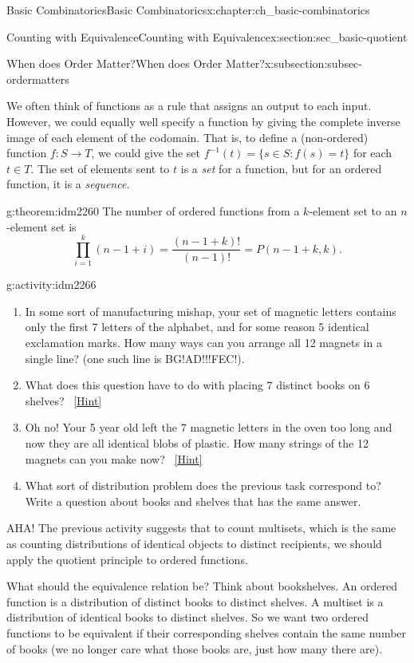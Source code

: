 \documentclass[oneside,10pt,]{book}
\numberwithin{equation}{chapter}
\def\inv{^{-1}}
\def\st{:}
\begin{document}
\begin{chapterptx}{Basic Combinatorics}{}{Basic Combinatorics}{}{}{x:chapter:ch_basic-combinatorics}
\begin{sectionptx}{Counting with Equivalence}{}{Counting with Equivalence}{}{}{x:section:sec_basic-quotient}
\begin{subsectionptx}{When does Order Matter?}{}{When does Order Matter?}{}{}{x:subsection:subsec-ordermatters}
\par
We often think of functions as a rule that assigns an output to each input.  However, we could equally well specify a function by giving the complete inverse image of each element of the codomain.  That is, to define a (non-ordered) function \(f:S \to T\), we could give the set \(f\inv(t) = \{s \in S \st f(s) = t\}\) for each \(t \in T\).  The set of elements sent to \(t\) is a \emph{set} for a function, but for an ordered function, it is a \emph{sequence}.%
\begin{theorem}{}{}{g:theorem:idm2260}%
The number of ordered functions from a \(k\)-element set to an \(n\)-element set is%
\begin{equation*}
\prod_{i=1}^k (n-1+i) = \frac{(n-1+k)!}{(n-1)!} = P(n-1+k, k).
\end{equation*}
%
\end{theorem}
\begin{activity}{}{g:activity:idm2266}%
\begin{enumerate}[font=\bfseries,label=(\alph*),ref=\alph*]
\item{}In some sort of manufacturing mishap, your set of magnetic letters contains only the first 7 letters of the alphabet, and for some reason 5 identical exclamation marks.  How many ways can you arrange all 12 magnets in a single line?  (one such line is BG!AD!!!FEC!).%
\item{}What does this question have to do with placing \(7\) distinct books on \(6\) shelves?%
\qquad~\hfill{\tiny\hyperlink{g:hint:idm2282-back}{[Hint]}}\item{}Oh no! Your 5 year old left the 7 magnetic letters in the oven too long and now they are all identical blobs of plastic.  How many strings of the 12 magnets can you make now?%
\qquad~\hfill{\tiny\hyperlink{g:hint:idm2290-back}{[Hint]}}\item{}What sort of distribution problem does the previous task correspond to?  Write a question about books and shelves that has the same answer.%
\end{enumerate}
\end{activity}
AHA!  The previous activity suggests that to count multisets, which is the same as counting distributions of identical objects to distinct recipients, we should apply the quotient principle to ordered functions.%
\par
What should the equivalence relation be?  Think about bookshelves.  An ordered function is a distribution of distinct books to distinct shelves.  A multiset is a distribution of identical books to distinct shelves.  So we want two ordered functions to be equivalent if their corresponding shelves contain the same number of books (we no longer care what those books are, just how many there are).%

\end{subsectionptx}
\end{sectionptx}
\end{chapterptx}
\end{document}

